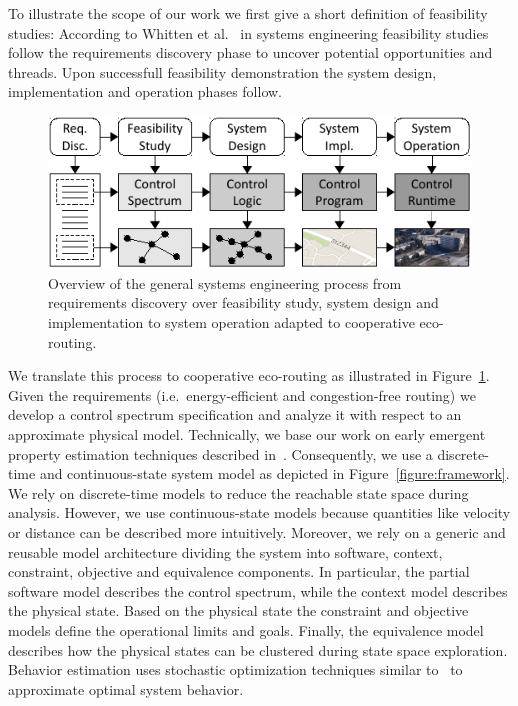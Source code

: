 \documentclass[conference]{../cls/IEEEtran}
\begin{document}
To illustrate the scope of our work we first give a short definition of feasibility studies: 
According to Whitten et al.~\cite{Whitten2005} in systems engineering feasibility studies follow the requirements discovery phase to uncover potential opportunities and threads.
Upon successfull feasibility demonstration the system design, implementation and operation phases follow.

\begin{figure}[b]
	\centering
	\includegraphics{../gfx/process.pdf}
	\caption{Overview of the general systems engineering process from requirements discovery over feasibility study, system design and implementation to system operation adapted to cooperative eco-routing.}
	\label{figure:process}
\end{figure}
We translate this process to cooperative eco-routing as illustrated in Figure~\ref{figure:process}.
Given the requirements (i.e.\ energy-efficient and congestion-free routing) we develop a control spectrum specification and analyze it with respect to an approximate physical model.
Technically, we base our work on early emergent property estimation techniques described in~\cite{Hackenberg2012}.
Consequently, we use a discrete-time and continuous-state system model as depicted in Figure~\ref{figure:framework}.
We rely on discrete-time models to reduce the reachable state space during analysis.
However, we use continuous-state models because quantities like velocity or distance can be described more intuitively.
Moreover, we rely on a generic and reusable model architecture dividing the system into software, context, constraint, objective and equivalence components.
In particular, the partial software model describes the control spectrum, while the context model describes the physical state.
Based on the physical state the constraint and objective models define the operational limits and goals.
Finally, the equivalence model describes how the physical states can be clustered during state space exploration.
Behavior estimation uses stochastic optimization techniques similar to~\cite{Pereira1991} to approximate optimal system behavior.
\end{document}
